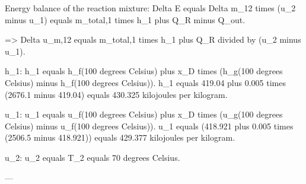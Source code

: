 Energy balance of the reaction mixture:  
Delta E equals Delta m_12 times (u_2 minus u_1) equals m_total,1 times h_1 plus Q_R minus Q_out.  

=> Delta u_m,12 equals m_total,1 times h_1 plus Q_R divided by (u_2 minus u_1).  

h_1:  
h_1 equals h_f(100 degrees Celsius) plus x_D times (h_g(100 degrees Celsius) minus h_f(100 degrees Celsius)).  
h_1 equals 419.04 plus 0.005 times (2676.1 minus 419.04) equals 430.325 kilojoules per kilogram.  

u_1:  
u_1 equals u_f(100 degrees Celsius) plus x_D times (u_g(100 degrees Celsius) minus u_f(100 degrees Celsius)).  
u_1 equals (418.921 plus 0.005 times (2506.5 minus 418.921)) equals 429.377 kilojoules per kilogram.  

u_2:  
u_2 equals T_2 equals 70 degrees Celsius.  

---